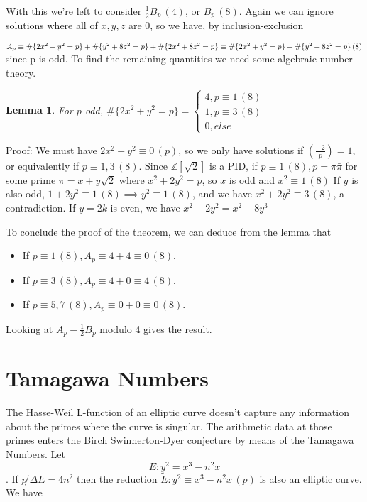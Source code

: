 \documentclass[11pt,a4paper]{amsart}
\theoremstyle{plain}
\newtheorem{lemma}[prop]{Lemma}
\theoremstyle{definition}
\theoremstyle{remark}
\numberwithin{equation}{section}
\newcommand{\ZZ}{{\mathbb Z}}
\newcommand{\1}{{\mathds 1}}
\begin{document}
With this we're left to consider $\frac{1}{2}B_p \, (4)$, or $B_p \, (8)$. Again we can
ignore solutions where all of $x, y, z$ are 0, so we have, by inclusion-exclusion

\( A_p \equiv \#\{ 2x^2 + y^2 = p\} + \#\{y^2 + 8z^2 = p\} + \#\{2x^2 + 8z^2 = p\} \\
\equiv \#\{ 2x^2 + y^2 = p\} + \#\{y^2 + 8z^2 = p\} \, (8)\)
since p is odd. To find the remaining quantities we need some algebraic number
theory.

\begin{lemma}
  For $p$ odd, $\#\{2x^2 + y^2 = p\} = \begin{cases} 4,
    p \equiv 1 \, (8) \\
    1, p \equiv 3 \, (8) \\
    0, else \end{cases}$
\end{lemma}
Proof: We must have $2x^2 + y^2 \equiv 0 \, (p)$, so we only have solutions if
$(\frac{-2}{p}) = 1$, or equivalently if $p \equiv 1, 3 \, (8)$. Since
$\ZZ[\sqrt{2}]$ is a PID, if $p \equiv 1 \, (8), p = \pi \bar{\pi}$ for some
prime $\pi = x + y \sqrt{2}$ where $x^2 + 2y^2 = p$, so $x$ is odd and $x^2
\equiv 1 \, (8)$
If $y$ is also odd, $1 + 2y^2 \equiv 1 \, (8) \implies y^2 \equiv 1 \, (8)$, and
we have $x^2 + 2y^2 \equiv 3 \, (8)$, a contradiction.
If $y = 2k$ is even, we have $x^2 + 2y^2 = x^2 + 8y^3$ 

To conclude the proof of the theorem, we can deduce from the lemma that
\begin{itemize}
  \item If $p \equiv 1 \, (8), A_p \equiv 4+4 \equiv 0 \, (8)$.
  \item If $p \equiv 3 \, (8), A_p \equiv 4 + 0 \equiv 4 \, (8)$.
  \item If $p \equiv 5, 7 \, (8), A_p \equiv 0 + 0 \equiv 0 \, (8)$.
\end{itemize} 
Looking at $A_p - \frac{1}{2} B_p$ modulo 4 gives the result.

\section{Tamagawa Numbers}

The Hasse-Weil L-function of an elliptic curve doesn't capture any information
about the primes where the curve is singular. The arithmetic data at those
primes enters the Birch Swinnerton-Dyer conjecture by means of the Tamagawa
Numbers. Let
$$ E : y^2 = x^3 - n^2 x $$.
If $p \not| \Delta E = 4n^2$ then the reduction $\tilde{E} : y^2 \equiv x^3 - n^2 x \,
(p)$ is
also an elliptic curve. We have
\end{document}
